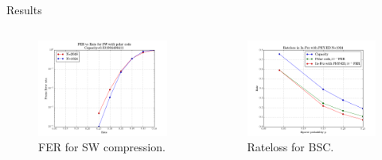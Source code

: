 \documentclass[final,hyperref={pdfpagelabels=false}]{beamer}
\begin{document}
\begin{frame}[t]
\begin{columns}[t]
\begin{column}{.465\textwidth}
\begin{block}{Results}
\begin{columns} %
\begin{column}{.5\textwidth}
\begin{figure}
\includegraphics[width=0.9\linewidth]{swfer.png}
\caption{FER for SW compression.}
\end{figure}
\end{column}
\begin{column}{.5\textwidth}
\begin{figure}
\includegraphics[width=0.9\linewidth]{rateloss.png}
\caption{Rateloss for BSC.}
\end{figure}
\end{column}
\end{columns}
\end{block}


\end{column}
\end{columns}
\end{frame}
\end{document}

